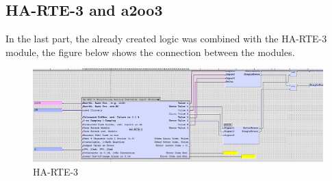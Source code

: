 \subsection{HA-RTE-3 and a2oo3}
In the last part, the already created logic was combined with the HA-RTE-3 module, the figure below shows the connection between the modules.
\begin{figure}[!htb]
    \centering
    \includegraphics[scale=0.4]{images/del2f}
     \caption{HA-RTE-3 }
\end{figure}